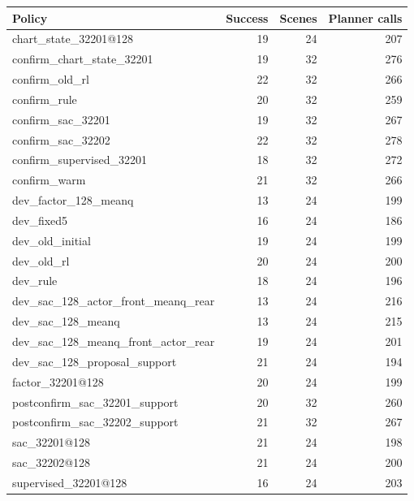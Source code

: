 \begin{tabular}{lrrr}
\hline
Policy & Success & Scenes & Planner calls \\
\hline
chart\_state\_32201@128 & 19 & 24 & 207 \\
confirm\_chart\_state\_32201 & 19 & 32 & 276 \\
confirm\_old\_rl & 22 & 32 & 266 \\
confirm\_rule & 20 & 32 & 259 \\
confirm\_sac\_32201 & 19 & 32 & 267 \\
confirm\_sac\_32202 & 22 & 32 & 278 \\
confirm\_supervised\_32201 & 18 & 32 & 272 \\
confirm\_warm & 21 & 32 & 266 \\
dev\_factor\_128\_meanq & 13 & 24 & 199 \\
dev\_fixed5 & 16 & 24 & 186 \\
dev\_old\_initial & 19 & 24 & 199 \\
dev\_old\_rl & 20 & 24 & 200 \\
dev\_rule & 18 & 24 & 196 \\
dev\_sac\_128\_actor\_front\_meanq\_rear & 13 & 24 & 216 \\
dev\_sac\_128\_meanq & 13 & 24 & 215 \\
dev\_sac\_128\_meanq\_front\_actor\_rear & 19 & 24 & 201 \\
dev\_sac\_128\_proposal\_support & 21 & 24 & 194 \\
factor\_32201@128 & 20 & 24 & 199 \\
postconfirm\_sac\_32201\_support & 20 & 32 & 260 \\
postconfirm\_sac\_32202\_support & 21 & 32 & 267 \\
sac\_32201@128 & 21 & 24 & 198 \\
sac\_32202@128 & 21 & 24 & 200 \\
supervised\_32201@128 & 16 & 24 & 203 \\
\hline
\end{tabular}
